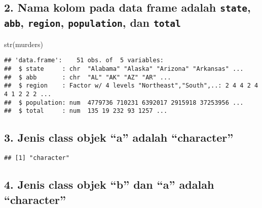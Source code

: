 \documentclass[
]{article}
\newenvironment{Shaded}{\begin{snugshade}}{\end{snugshade}}
\newcommand{\FunctionTok}[1]{\textcolor[rgb]{0.00,0.00,0.00}{#1}}
\newcommand{\NormalTok}[1]{#1}
\newcommand{\OtherTok}[1]{\textcolor[rgb]{0.56,0.35,0.01}{#1}}
\newcommand{\SpecialCharTok}[1]{\textcolor[rgb]{0.00,0.00,0.00}{#1}}
\begin{document}
\hypertarget{nama-kolom-pada-data-frame-adalah-state-abb-region-population-dan-total}{%
\subsection{\texorpdfstring{2. Nama kolom pada data frame adalah
\texttt{state}, \texttt{abb}, \texttt{region}, \texttt{population}, dan
\texttt{total}}{2. Nama kolom pada data frame adalah state, abb, region, population, dan total}}\label{nama-kolom-pada-data-frame-adalah-state-abb-region-population-dan-total}}

\begin{Shaded}
\begin{Highlighting}[]
\FunctionTok{str}\NormalTok{(murders)}
\end{Highlighting}
\end{Shaded}

\begin{verbatim}
## 'data.frame':    51 obs. of  5 variables:
##  $ state     : chr  "Alabama" "Alaska" "Arizona" "Arkansas" ...
##  $ abb       : chr  "AL" "AK" "AZ" "AR" ...
##  $ region    : Factor w/ 4 levels "Northeast","South",..: 2 4 4 2 4 4 1 2 2 2 ...
##  $ population: num  4779736 710231 6392017 2915918 37253956 ...
##  $ total     : num  135 19 232 93 1257 ...
\end{verbatim}

\hypertarget{jenis-class-objek-a-adalah-character}{%
\subsection{3. Jenis class objek ``a'' adalah
``character''}\label{jenis-class-objek-a-adalah-character}}

\begin{Shaded}
\end{Shaded}

\begin{verbatim}
## [1] "character"
\end{verbatim}

\hypertarget{jenis-class-objek-b-dan-a-adalah-character}{%
\subsection{4. Jenis class objek ``b'' dan ``a'' adalah
``character''}\label{jenis-class-objek-b-dan-a-adalah-character}}
\end{document}
